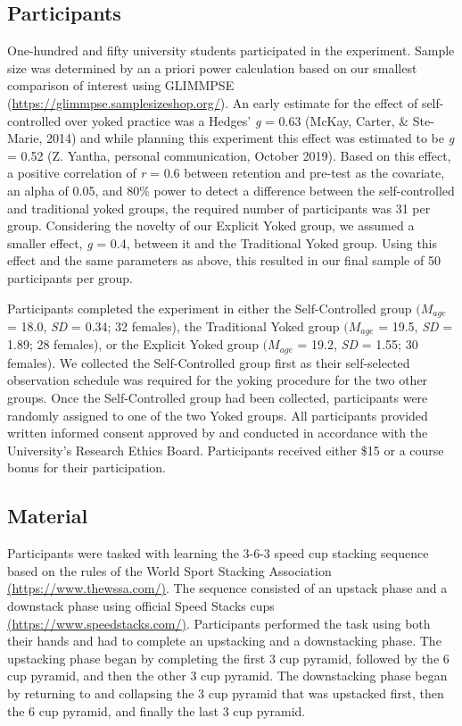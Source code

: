 \documentclass[
  english,
  doc, donotrepeattitle,floatsintext]{apa7}
\begin{document}
\hypertarget{participants}{%
\subsection{Participants}\label{participants}}

One-hundred and fifty university students participated in the experiment. Sample size was determined by an a priori power calculation based on our smallest comparison of interest using GLIMMPSE (\url{https://glimmpse.samplesizeshop.org/}). An early estimate for the effect of self-controlled over yoked practice was a Hedges' \emph{g} = 0.63 (McKay, Carter, \& Ste-Marie, 2014) and while planning this experiment this effect was estimated to be \emph{g} = 0.52 (Z. Yantha, personal communication, October 2019). Based on this effect, a positive correlation of \emph{r} = 0.6 between retention and pre-test as the covariate, an alpha of 0.05, and 80\% power to detect a difference between the self-controlled and traditional yoked groups, the required number of participants was 31 per group. Considering the novelty of our Explicit Yoked group, we assumed a smaller effect, \emph{g} = 0.4, between it and the Traditional Yoked group. Using this effect and the same parameters as above, this resulted in our final sample of 50 participants per group.

Participants completed the experiment in either the Self-Controlled group \((M_{age}\) = 18.0, \emph{SD} = 0.34; 32 females), the Traditional Yoked group \((M_{age}\) = 19.5, \emph{SD} = 1.89; 28 females), or the Explicit Yoked group \((M_{age}\) = 19.2, \emph{SD} = 1.55; 30 females). We collected the Self-Controlled group first as their self-selected observation schedule was required for the yoking procedure for the two other groups. Once the Self-Controlled group had been collected, participants were randomly assigned to one of the two Yoked groups. All participants provided written informed consent approved by and conducted in accordance with the University's Research Ethics Board. Participants received either \$15 or a course bonus for their participation.

\hypertarget{material}{%
\subsection{Material}\label{material}}

Participants were tasked with learning the 3-6-3 speed cup stacking sequence based on the rules of the World Sport Stacking Association \href{https://www.thewssa.com/}{(https://www.thewssa.com/)}. The sequence consisted of an upstack phase and a downstack phase using official Speed Stacks cups \href{https://www.speedstacks.com/}{(https://www.speedstacks.com/)}. Participants performed the task using both their hands and had to complete an upstacking and a downstacking phase. The upstacking phase began by completing the first 3 cup pyramid, followed by the 6 cup pyramid, and then the other 3 cup pyramid. The downstacking phase began by returning to and collapsing the 3 cup pyramid that was upstacked first, then the 6 cup pyramid, and finally the last 3 cup pyramid.
\end{document}
